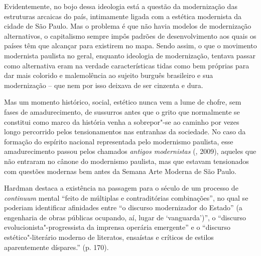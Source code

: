 Evidentemente, no bojo dessa ideologia está a questão da modernização
das estruturas arcaicas do país, intimamente ligada com a estética
modernista da cidade de São Paulo. Mas o problema é que não havia
modelos de modernização alternativos, o capitalismo sempre impôs padrões
de desenvolvimento aos quais os países têm que alcançar para existirem
no mapa. Sendo assim, o que o movimento modernista paulista no geral,
enquanto ideologia de modernização, tentava passar como alternativa eram
na verdade características tidas como bem próprias para dar mais
colorido e malemolência ao sujeito burguês brasileiro e sua modernização
-- que nem por isso deixava de ser cinzenta e dura.

Mas um momento histórico, social, estético nunca vem a lume de chofre,
sem fases de amadurecimento, de sussurros antes que o grito que
normalmente se constitui como marco da história venha a sobrepor"-se ao
caminho por vezes longo percorrido pelos tensionamentos nas entranhas da
sociedade. No caso da formação do espírito nacional representada pelo
modernismo paulista, esse amadurecimento passou pelos chamados
\emph{antigos modernistas} (, 2009), aqueles que não entraram no
cânone do modernismo paulista, mas que estavam tensionados com questões
modernas bem antes da Semana Arte Moderna de São Paulo.

Hardman destaca a existência na passagem para o século  de um processo
de \emph{continuum} mental ``feito de múltiplas e contraditórias
combinações'', no qual se poderiam identificar afinidades entre ``o
discurso modernizador do Estado'' (a engenharia de obras públicas
ocupando, aí, lugar de `vanguarda')'', o ``discurso
evolucionista"-progressista da imprensa operária emergente'' e o
``discurso estético"-literário moderno de literatos, ensaístas e críticos
de estilos aparentemente díspares.'' (p. 170).

